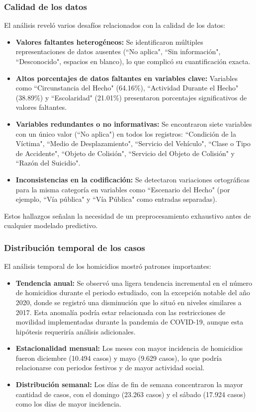 \documentclass[lettersize,journal]{IEEEtran}
\begin{document}
\subsubsection{Calidad de los datos}
El análisis reveló varios desafíos relacionados con la calidad de los datos:
\begin{itemize}
\item \textbf{Valores faltantes heterogéneos:} Se identificaron múltiples representaciones de datos ausentes (``No aplica", ``Sin información", ``Desconocido", espacios en blanco), lo que complicó su cuantificación exacta.
\item \textbf{Altos porcentajes de datos faltantes en variables clave:} Variables como ``Circunstancia del Hecho" (64.16\%), ``Actividad Durante el Hecho" (38.89\%) y ``Escolaridad" (21.01\%) presentaron porcentajes significativos de valores faltantes.
\item \textbf{Variables redundantes o no informativas:} Se encontraron siete variables con un único valor (``No aplica") en todos los registros: ``Condición de la Víctima", ``Medio de Desplazamiento", ``Servicio del Vehículo", ``Clase o Tipo de Accidente", ``Objeto de Colisión", ``Servicio del Objeto de Colisión" y ``Razón del Suicidio".
\item \textbf{Inconsistencias en la codificación:} Se detectaron variaciones ortográficas para la misma categoría en variables como ``Escenario del Hecho" (por ejemplo, ``Vía pública" y ``Vía Pública" como entradas separadas).
\end{itemize}
Estos hallazgos señalan la necesidad de un preprocesamiento exhaustivo antes de cualquier modelado predictivo.
\subsubsection{Distribución temporal de los casos}
El análisis temporal de los homicidios mostró patrones importantes:
\begin{itemize}
\item \textbf{Tendencia anual:} Se observó una ligera tendencia incremental en el número de homicidios durante el periodo estudiado, con la excepción notable del año 2020, donde se registró una disminución que lo situó en niveles similares a 2017. Esta anomalía podría estar relacionada con las restricciones de movilidad implementadas durante la pandemia de COVID-19, aunque esta hipótesis requeriría análisis adicionales.
\item \textbf{Estacionalidad mensual:} Los meses con mayor incidencia de homicidios fueron diciembre (10.494 casos) y mayo (9.629 casos), lo que podría relacionarse con periodos festivos y de mayor actividad social.
\item \textbf{Distribución semanal:} Los días de fin de semana concentraron la mayor cantidad de casos, con el domingo (23.263 casos) y el sábado (17.924 casos) como los días de mayor incidencia.
\end{itemize}
\end{document}
